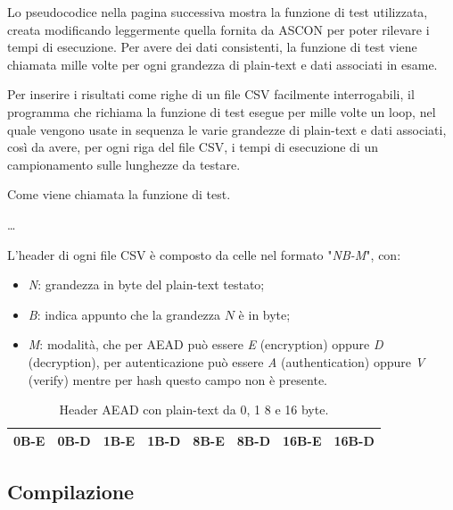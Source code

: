 \documentclass[12pt,a4paper,italian]{report}
\begin{document}
Lo pseudocodice nella pagina successiva mostra la funzione di test utilizzata, creata modificando leggermente quella fornita da ASCON per poter rilevare i tempi di esecuzione. Per avere dei dati consistenti, la funzione di test viene chiamata mille volte per ogni grandezza di plain-text e dati associati in esame.

\noindent Per inserire i risultati come righe di un file CSV facilmente interrogabili, il programma che richiama la funzione di test esegue per mille volte un loop, nel quale vengono usate in sequenza le varie grandezze di plain-text e dati associati, così da avere, per ogni riga del file CSV, i tempi di esecuzione di un campionamento sulle lunghezze da testare.

\begin{algorithm}
    \caption{Come viene chiamata la funzione di test.}
    \begin{algorithmic}[1]
            \State {}
            \State \dots
            \State {}
        \EndFor
    \end{algorithmic}
\end{algorithm}

\noindent L'header di ogni file CSV è composto da celle nel formato "\textit{NB-M}", con:
\begin{itemize}
    \item \textit{N}: grandezza in byte del plain-text testato;
    \item \textit{B}: indica appunto che la grandezza $N$ è in byte;
    \item \textit{M}: modalità, che per AEAD può essere \textit{E} (encryption) oppure \textit{D} (decryption), per autenticazione può essere \textit{A} (authentication) oppure \textit{V} (verify) mentre per hash questo campo non è presente.
\end{itemize}

\begin{table}[H]
    \centering
	\begin{tabular}{|c|c|c|c|c|c|c|c|}
		\hline
		0B-E & 0B-D & 1B-E & 1B-D & 8B-E & 8B-D & 16B-E & 16B-D \\
		\hline
    \end{tabular}
    \caption{Header AEAD con plain-text da 0, 1 8 e 16 byte.}
\end{table}

\subsection{Compilazione}
\end{document}
